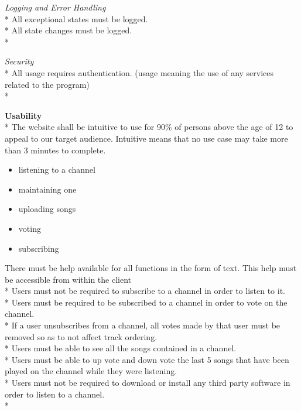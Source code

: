 \documentclass[a4paper,11pt,report]{article}
\begin{document}
\textit{Logging and Error Handling} \\*
All exceptional states must be logged.\\*
All state changes must be logged.\\*

\textit{Security} \\*
All usage requires authentication. (usage meaning the use of any services related to the program)\\*

\textbf{Usability} \\*
The website shall be intuitive to use for 90\% of persons above the age of 12 to appeal to our target audience. Intuitive means that no use case may take more than 3 minutes to complete.
\begin{itemize}
\item listening to a channel
\item maintaining one 
\item uploading songs
\item voting
\item subscribing
\end{itemize}

There must be help available for all functions in the form of text. This help must be accessible from within the client \\*
Users must not be required to subscribe to a channel in order to listen to it. \\*
Users must be required to be subscribed to a channel in order to vote on the channel. \\*
If a user unsubscribes from a channel, all votes made by that user must be removed so as to not affect track ordering. \\*
Users must be able to see all the songs contained in a channel. \\*
Users must be able to up vote and down vote the last 5 songs that have been played on the channel while they were listening. \\*
Users must not be required to download or install any third party software in order to listen to a channel. \\*
\end{document}
